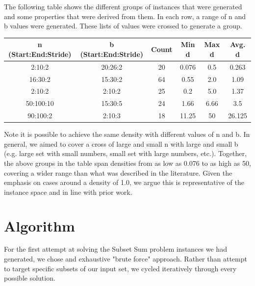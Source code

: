 \documentclass{article}
\begin{document}
The following table shows the different groups of instances that were generated
and some properties that were derived from them. In each row, a range of n and
b values were generated. These lists of values were crossed to generate
a group.
\begin{center}
  \begin{tabular}{| c | c | c | c | c | c |}
    \hline
    n (Start:End:Stride) & b (Start:End:Stride) & Count & Min d & Max d & Avg. d \\
    \hline
    2:10:2 & 20:26:2 & 20 & 0.076 & 0.5 & 0.263 \\
    \hline
    16:30:2 & 15:30:2 & 64 & 0.55 & 2.0 & 1.09 \\    
    \hline
    2:10:2 & 2:10:2 & 25 & 0.2 & 5.0 & 1.37 \\
    \hline
    50:100:10 & 15:30:5 & 24 & 1.66 & 6.66 & 3.5 \\    
    \hline
    90:100:2 & 2:10:3 & 18 & 11.25 & 50 & 26.125 \\    
    \hline
  \end{tabular}
\end{center}
Note it is possible to achieve the same density with different values of n and b.
In general, we aimed to cover a cross of large and small n with large and small b
(e.g. large set with small numbers, small set with large numbers, etc.). Together,
the above groups in the table span densities from as low as 0.076 to as high as 50,
covering a wider range than what was described in the literature. Given the emphasis
on cases around a density of 1.0, we argue this is representative of the instance
space and in line with prior work.

\section{Algorithm}
For the first attempt at solving the Subset Sum problem instances we had generated, we
chose and exhaustive "brute force" approach. Rather than attempt to target specific
subsets of our input set, we cycled iteratively through every possible solution.
\end{document}

